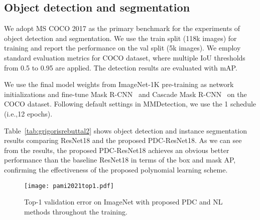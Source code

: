 \documentclass[runningheads]{llncs}
\providecommand\ie{i.e.,}
\begin{document}
\subsection{Object detection and segmentation}

We adopt MS COCO 2017 \cite{Lin2014} as the primary benchmark for the experiments of object detection and segmentation. We use the train split (118k images) for training and report the performance on the val split (5k images). We employ standard evaluation metrics for COCO dataset, where multiple IoU thresholds from 0.5 to 0.95 are applied. The detection results are evaluated with mAP.

We use the final model weights
from ImageNet-1K pre-training as network initializations and fine-tune Mask R-CNN~\cite{He2017} and Cascade Mask R-CNN~\cite{Cai2018} on the COCO dataset. Following default settings in MMDetection, we use the 1 schedule (\ie 12 epochs). 

Table~\ref{tab:grigorisrebuttal2} shows object detection and instance segmentation results comparing ResNet18 and the proposed PDC-ResNet18. As we can see from the results, the proposed PDC-ResNet18 achieves an obvious better performance than the baseline ResNet18 in terms of the box and mask AP, confirming the effectiveness of the proposed polynomial learning scheme.







\begin{figure} 
\centering
\centering
\texttt{[image: pami2021top1.pdf]}
\caption{Top-1 validation error on ImageNet with proposed PDC and NL methods throughout the training.}
\label{fig:imagenet}
\end{figure}




 
\end{document}
